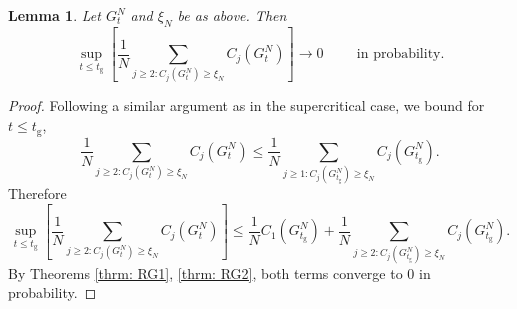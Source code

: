 \documentclass[11pt, notitlepage]{article}
\newtheorem{lem}[thm]{Lemma}
\begin{document}
\begin{lem}\label{lemma: large clusters below criticality} Let $G^N_t$ and $\xi_N$ be as above. Then \begin{equation}
    \sup_{t\le t_\mathrm{g}} \left[\frac{1}{N}\sum_{j\geq 2: C_j(G^N_t)\ge \xi_N} C_j(G^N_t)\right]\rightarrow 0\hspace{1cm}\text{in probability}.
\end{equation} \end{lem}\begin{proof} Following a similar argument as in the supercritical case, we bound for $t\leq t_\mathrm{g}$, \begin{equation}
    \frac{1}{N}\sum_{j\geq 2: C_j(G^N_t)\geq \xi_N} C_j(G^N_t) \leq \frac{1}{N}\sum_{j\geq 1: C_j(G^N_{t_\mathrm{g}})\geq \xi_N} C_j(G^N_{t_\mathrm{g}}).
\end{equation} Therefore \begin{equation}
    \sup_{t\le t_\mathrm{g}} \left[\frac{1}{N}\sum_{j\geq 2: C_j(G^N_t)\geq \xi_N} C_j(G^N_t)\right] \leq  \frac{1}{N}C_1(G^N_{t_\mathrm{g}})+ \frac{1}{N}\sum_{j\geq 2: C_j(G^N_{t_\mathrm{g}})\geq \xi_N} C_j(G^N_{t_\mathrm{g}}).
\end{equation} By Theorems \ref{thrm: RG1}, \ref{thrm: RG2}, both terms converge to $0$ in probability. \end{proof}  
\end{document}
